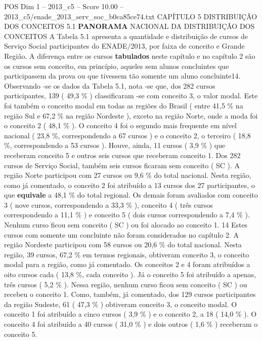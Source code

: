 \begin{textsample}{POS Dim 1 – 2013\_c5 – Score 10.00 – 2013\_c5/enade\_2013\_serv\_soc\_b0ca85ce74.txt}  \label{ex:f1_pos_082}
CAPÍTULO 5 DISTRIBUIÇÃO DOS CONCEITOS 5.1 \textbf{PANORAMA} NACIONAL DA DISTRIBUIÇÃO DOS CONCEITOS A Tabela 5.1 apresenta a quantidade e distribuição de cursos de Serviço Social participantes do ENADE/2013, por faixa de conceito e Grande Região.
A diferença entre os cursos \textbf{tabulados} neste capítulo e no capítulo 2 são os cursos sem conceito, em princípio, aqueles sem alunos concluintes que participassem da prova ou que tivessem tão somente um aluno concluinte14.
Observando -se os dados da Tabela 5.1, nota -se que, dos 282 cursos participantes, 139 ( 49,3 \% ) classificaram -se com conceito 3, o valor modal.
Este foi também o conceito modal em todas as regiões do Brasil ( entre 41,5 \% na região Sul e 67,2 \% na região Nordeste ), exceto na região Norte, onde a moda foi o conceito 2 ( 48,1 \% ).
O conceito 4 foi o segundo mais frequente em nível nacional ( 23,8 \%, correspondendo a 67 cursos ) e o conceito 2, o terceiro ( 18,8 \%, correspondendo a 53 cursos ).
Houve, ainda, 11 cursos ( 3,9 \% ) que receberam conceito 5 e outros seis cursos que receberam conceito 1.
Dos 282 cursos de Serviço Social, também seis cursos ficaram sem conceito ( SC ).
A região Norte participou com 27 cursos ou 9,6 \% do total nacional.
Nesta região, como já comentado, o conceito 2 foi atribuído a 13 cursos dos 27 participantes, o que \textbf{equivale} a 48,1 \% do total regional.
Os demais foram avaliados com conceito 3 ( nove cursos, correspondendo a 33,3 \% ), conceito 4 ( três cursos correspondendo a 11,1 \% ) e conceito 5 ( dois cursos correspondendo a 7,4 \% ).
Nenhum curso ficou sem conceito ( SC ) ou foi alocado ao conceito 1. 14 Estes cursos com somente um concluinte não foram considerados no capítulo 2.
A região Nordeste participou com 58 cursos ou 20,6 \% do total nacional.
Nesta região, 39 cursos, 67,2 \% em termos regionais, obtiveram conceito 3, o conceito modal para a região, como já comentado.
Os conceitos 2 e 4 foram atribuídos a oito cursos cada ( 13,8 \%, cada conceito ).
Já o conceito 5 foi atribuído a apenas, três cursos ( 5,2 \% ).
Nessa região, nenhum curso ficou sem conceito ( SC ) ou recebeu o conceito 1.
Como, também, já comentado, dos 129 cursos participantes da região Sudeste, 61 ( 47,3 \% ) obtiveram conceito 3, o conceito modal.
O conceito 1 foi atribuído a cinco cursos ( 3,9 \% ) e o conceito 2, a 18 ( 14,0 \% ).
O conceito 4 foi atribuído a 40 cursos ( 31,0 \% ) e dois outros ( 1,6 \% ) receberam o conceito 5.

\end{textsample}
